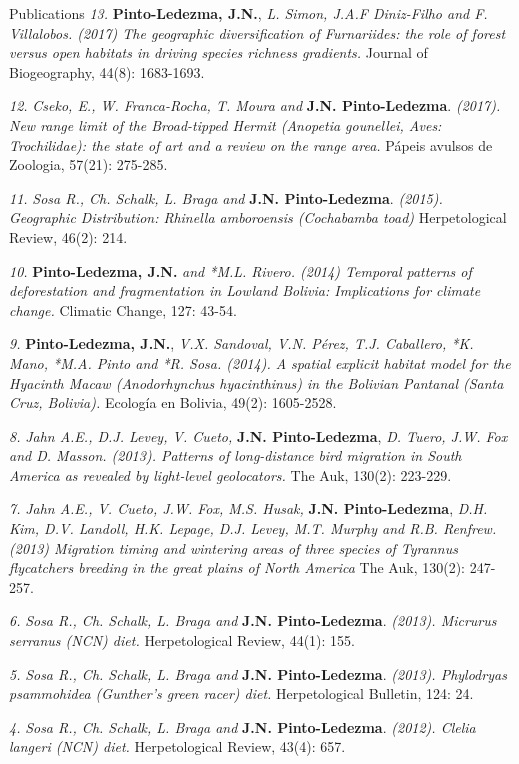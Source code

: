 \documentclass{resume} %
\begin{document}
\begin{rSection}{Publications}
{\em 13.} {\bf{Pinto-Ledezma, J.N.}}, {\em L. Simon, J.A.F Diniz-Filho and F. Villalobos. (2017) The geographic diversification of Furnariides: the role of forest versus open habitats in driving species richness gradients.} {Journal of Biogeography, 44(8): 1683-1693}. 

{\em 12.} {\em Cseko, E., W. Franca-Rocha, T. Moura and} {\bf{J.N. Pinto-Ledezma}}. {\em (2017). New range limit of the Broad-tipped Hermit ({\em Anopetia gounellei}, Aves: Trochilidae): the state of art and a review on the range area.} {Pápeis avulsos de Zoologia, 57(21): 275-285}. 

{\em 11.} {\em *Sosa R., Ch. Schalk, L. Braga and} {\bf{J.N. Pinto-Ledezma}}. {\em (2015). Geographic Distribution: {\em Rhinella amboroensis} (Cochabamba toad)} {Herpetological Review, 46(2): 214}.

{\em 10.} {\bf{Pinto-Ledezma, J.N.}} {\em and *M.L. Rivero. (2014) Temporal patterns of deforestation and fragmentation in Lowland Bolivia: Implications for climate change.} {Climatic Change, 127: 43-54}. 

{\em 9.} {\bf{Pinto-Ledezma, J.N.}}, {\em V.X. Sandoval, V.N. Pérez, T.J. Caballero, *K. Mano, *M.A. Pinto and *R. Sosa. (2014). A spatial explicit habitat model for the Hyacinth Macaw ({\em Anodorhynchus hyacinthinus}) in the Bolivian Pantanal (Santa Cruz, Bolivia).} {Ecología en Bolivia, 49(2): 1605-2528}.

{\em 8.} {\em Jahn A.E., D.J. Levey, V. Cueto,} {\bf{J.N. Pinto-Ledezma}}, {\em D. Tuero, J.W. Fox and D. Masson. (2013). Patterns of long-distance bird migration in South America as revealed by light-level geolocators.} {The Auk, 130(2): 223-229}. 

{\em 7.} {\em Jahn A.E., V. Cueto, J.W. Fox, M.S. Husak,} {\bf{J.N. Pinto-Ledezma}}, {\em D.H. Kim, D.V. Landoll, H.K. Lepage, D.J. Levey, M.T. Murphy and R.B. Renfrew. (2013) Migration timing and wintering areas of three species of Tyrannus flycatchers breeding in the great plains of North America} {The Auk, 130(2): 247-257}. 

{\em 6.} {\em *Sosa R., Ch. Schalk, L. Braga and} {\bf{J.N. Pinto-Ledezma}}. {\em (2013). {\em Micrurus serranus} (NCN) diet.} {Herpetological Review, 44(1): 155}. 

{\em 5.} {\em *Sosa R., Ch. Schalk, L. Braga and} {\bf{J.N. Pinto-Ledezma}}. {\em (2013). {\em Phylodryas psammohidea} (Gunther's green racer) diet.} {Herpetological Bulletin, 124: 24}. 

{\em 4.} {\em *Sosa R., Ch. Schalk, L. Braga and} {\bf{J.N. Pinto-Ledezma}}. {\em (2012). {\em Clelia langeri} (NCN) diet.} {Herpetological Review, 43(4): 657}. 


\end{rSection}
\end{document}
